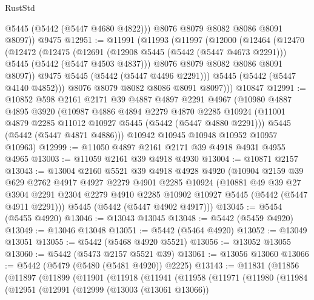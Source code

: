 \begin{lexlean}{RustStd}
\begin{coremodule}
{\begin{coremodule}
{{{{{{{{{{{{          @5445
          (@5442 (@5447 @4680 @4822)))
        @8076
        @8079
        @8082
        @8086
        @8091
        @8097))
    @9475
@12951 := @11991
    (@11993
      (@11997
        (@12000
          (@12464
            (@12470
              (@12472
                (@12475
                  (@12691
                    (@12908 @5445 (@5442 (@5447 @4673 @2291)))
                    @5445
                    (@5442 (@5447 @4503 @4837)))
                  @8076
                  @8079
                  @8082
                  @8086
                  @8091
                  @8097))
              @9475
              @5445
              (@5442 (@5447 @4496 @2291)))
            @5445
            (@5442 (@5447 @4140 @4852)))
          @8076
          @8079
          @8082
          @8086
          @8091
          @8097)))
    @10847
@12991 := @10852
    @598
    @2161
    @2171
    @39
    @4887
    @4897
    @2291
    @4967
    (@10980
      @4887
      @4895
      @3920
      (@10987
        @4886
        @4894
        @2279
        @4870
        @2285
        @10924
        (@11001 @4879 @2285 @11012 @10927 @5445 (@5442 (@5447 @4880 @2291)))
        @5445
        (@5442 (@5447 @4871 @4886)))
      @10942
      @10945
      @10948
      @10952
      @10957
      @10963)
@12999 := @11050 @4897 @2161 @2171 @39 @4918 @4931 @4955 @4965
@13003 := @11059 @2161 @39 @4918 @4930
@13004 := @10871 @2157
@13043 := @13004
    @2160
    @5521
    @39
    @4918
    @4928
    @4920
    (@10904
      @2159
      @39
      @629
      @2762
      @4917
      @4927
      @2279
      @4901
      @2285
      @10924
      (@10881
        @49
        @39
        @27
        @3904
        @2291
        @2304
        @2279
        @4910
        @2285
        @10902
        @10927
        @5445
        (@5442 (@5447 @4911 @2291)))
      @5445
      (@5442 (@5447 @4902 @4917)))
@13045 := @5454 (@5455 @4920)
@13046 := @13043 @13045
@13048 := @5442 (@5459 @4920)
@13049 := @13046 @13048
@13051 := @5442 (@5464 @4920)
@13052 := @13049 @13051
@13055 := @5442 (@5468 @4920 @5521)
@13056 := @13052 @13055
@13060 := @5442 (@5473 @2157 @5521 @39)
@13061 := @13056 @13060
@13066 := @5442 (@5479 (@5480 (@5481 @4920)) @2225)
@13143 := @11831
    (@11856
      (@11897
        (@11899
          (@11901
            (@11918
              (@11941
                (@11958
                  (@11971
                    (@11980
                      (@11984
                        (@12951
                          (@12991
                            (@12999
                              (@13003 (@13061 @13066))
}}}}}}}}}}}}
\end{coremodule}}
\end{coremodule}
\end{lexlean}
